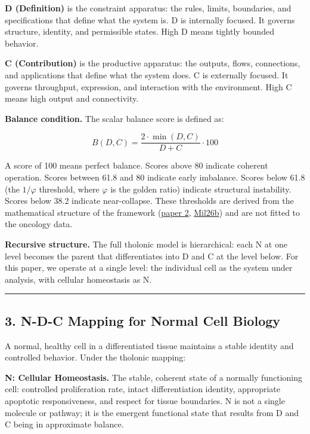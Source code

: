 \documentclass[
  11pt,
  letterpaper,
]{article}
\begin{document}
\textbf{D (Definition)} is the constraint apparatus: the rules, limits,
boundaries, and specifications that define what the system is. D is
internally focused. It governs structure, identity, and permissible
states. High D means tightly bounded behavior.

\textbf{C (Contribution)} is the productive apparatus: the outputs,
flows, connections, and applications that define what the system does. C
is externally focused. It governs throughput, expression, and
interaction with the environment. High C means high output and
connectivity.

\textbf{Balance condition.} The scalar balance score is defined as:

\[B(D,C) = \frac{2 \cdot \min(D,C)}{D + C} \cdot 100\]

A score of 100 means perfect balance. Scores above 80 indicate coherent
operation. Scores between 61.8 and 80 indicate early imbalance. Scores
below 61.8 (the \(1/\varphi\) threshold, where \(\varphi\) is the golden
ratio) indicate structural instability. Scores below 38.2 indicate
near-collapse. These thresholds are derived from the mathematical
structure of the framework
(\href{https://github.com/baardev/truevalue/blob/main/docnav/Research/papers/2_supply-chain-transparency-tvpci/2_supply-chain-transparency-tvpci.pdf}{paper
2},
\href{https://github.com/baardev/truevalue/blob/main/docnav/Research/papers/2_supply-chain-transparency-tvpci/2_supply-chain-transparency-tvpci.pdf}{Mil26b})
and are not fitted to the oncology data.

\textbf{Recursive structure.} The full tholonic model is hierarchical:
each N at one level becomes the parent that differentiates into D and C
at the level below. For this paper, we operate at a single level: the
individual cell as the system under analysis, with cellular homeostasis
as N.

\begin{center}\rule{0.5\linewidth}{0.5pt}\end{center}

\subsection{3. N-D-C Mapping for Normal Cell
Biology}\label{n-d-c-mapping-for-normal-cell-biology}

A normal, healthy cell in a differentiated tissue maintains a stable
identity and controlled behavior. Under the tholonic mapping:

\textbf{N: Cellular Homeostasis.} The stable, coherent state of a
normally functioning cell: controlled proliferation rate, intact
differentiation identity, appropriate apoptotic responsiveness, and
respect for tissue boundaries. N is not a single molecule or pathway; it
is the emergent functional state that results from D and C being in
approximate balance.
\end{document}
